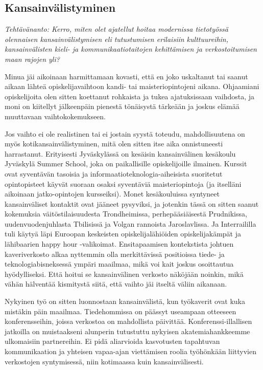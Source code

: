 \documentclass[utf8]{gradu3}
\begin{document}
\subsection{Kansainvälistyminen}

\textit{Tehtävänanto: Kerro, miten olet ajatellut hoitaa modernissa
  tietotyössä olennaisen kansainvälistymisen eli tutustumisen
  erilaisiin kulttuureihin, kansainvälisten kieli- ja
  kommunikaatiotaitojen kehittämisen ja verkostoitumisen maan rajojen
  yli?}

Minua jäi aikoinaan harmittamaan kovasti, että en joko uskaltanut tai
saanut aikaan lähteä opiskelijavaihtoon kandi- tai maisteriopintojeni
aikana. Ohjaamiani opiskelijoita olen sitten koettanut rohkaista ja
tukea ajatuksissaan vaihdosta, ja moni on kiitellyt jälkeenpäin
pienestä tönäisystä tärkeään ja joskus elämää muuttavaan
vaihtokokemukseen.

Jos vaihto ei ole realistinen tai ei jostain syystä toteudu,
mahdollisuutena on myös kotikansainvälistyminen, mitä olen sitten itse
aika onnistuneesti harrastanut. Erityisesti Jyväskylässä on kesäisin
kansainvälinen kesäkoulu Jyväskylä Summer School, joka on
paikallisille opiskelijoille ilmainen. Kurssit ovat syventävän
tasoisia ja informaatioteknologia-aiheisista suoritetut opintopisteet
käyvät suoraan osaksi syventäviä maisteriopintoja (ja itselläni
aikoinaan jatko-opintojen kursseiksi).
%
Monet kesäkouluissa syntyneet kansainväliset kontaktit ovat jääneet
pysyviksi, ja jotenkin tässä on sitten saanut kokemuksia
väitöstilaisuudesta Trondheimissa, perhepääsiäisestä Prudnikissa,
uudenvuodenjuhlasta Tbilisissä ja Volgan rannoista Jaroslavlissa. Ja
Interraililla tuli käytyä läpi Euroopan keskeisten opiskelijalähiöiden
opiskelijakämpät ja lähibaarien happy hour -valikoimat.
%
Ensitapaamisen kontekstista johtuen kaveriverkosto alkaa nyttemmin
olla merkittävissä positioissa tiede- ja teknologiabisneksessä ympäri
maailmaa, mikä voi kait joskus osoittautua hyödylliseksi. Että hoitui
se kansainvälinen verkosto näköjään noinkin, mikä vähän hälventää
kismitystä siitä, että vaihto jäi itseltä väliin aikanaan.

Nykyinen työ on sitten luonnostaan kansainvälistä, kun työkaverit ovat
kuka mistäkin päin maailmaa. Tiedehommissa on päässyt useampaan
otteeseen konferensseihin, joissa verkostoa on mahdollista
päivittää. Konferenssi-illallisen jatkoilla on muistaakseni alunperin
tutustuttu nykyisen akatemiahankkeemme ulkomaisiin partnereihin. Ei
pidä aliarvioida kasvotusten tapahtuvan kommunikaation ja yhteisen
vapaa-ajan viettämisen roolia työhönkään liittyvien verkostojen
syntymisessä, niin kotimaassa kuin kansainvälisesti.
\end{document}
